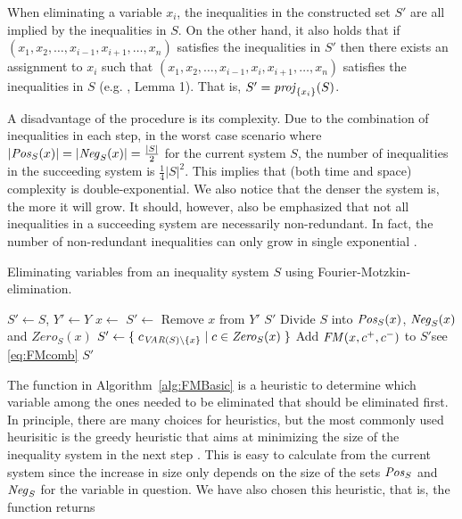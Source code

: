 When eliminating a variable $x_i$, the inequalities in the constructed set $S'$ are all implied by the inequalities in $S$. On the other hand, it also holds that if $(x_1, x_2, \ldots, x_{i-1}, x_{i+1}, \ldots, x_n)$ satisfies the inequalities in $S'$ then there exists an assignment to $x_i$ such that $(x_1, x_2, \ldots, x_{i-1}, x_i, x_{i+1}, \ldots, x_n)$ satisfies the inequalities in $S$ {(e.g. \cite{duffin74}, Lemma 1)}. That is, $S' = \mathit{proj}_{\{x_i\}}(S)$.

A disadvantage of the procedure is its complexity. Due to the combination of inequalities in each step, in the worst case scenario where $|\mathit{Pos}_S(x)| = |\mathit{Neg}_S(x)| = \frac{|S|}{2}$ for the current system $S$, the number of inequalities in the succeeding system is $\frac{1}{4}|S|^2$. This implies that (both time and space) complexity is double-exponential.  
We also notice that the denser the system is, the more it will grow. 
It should, however, also be emphasized that not all inequalities in a succeeding system are necessarily non-redundant. In fact, the
number of non-redundant inequalities can only grow in single exponential \cite{Monniaux10}.
%
\begin{algorithm}
\caption{Eliminating variables from an inequality system $S$ using Fourier-Motzkin-elimination.}\label{alg:FMBasic}
\begin{algorithmic}[1]
	\State  $S'\gets S$, $Y'\gets Y$
		\State $x\gets$ 
		\State $S' \gets$ 
		\State Remove $x$ from $Y'$
	\EndWhile
	\State \Return $S'$
\EndFunction
\Statex
{}
\State Divide $S$ into $\mathit{Pos}_S(x)$, $\mathit{Neg}_S(x)$ and $\mathit{Zero}_S(x)$
\State $S'\gets \{\;{c_{\mathit{VAR}(S)\setminus\{x\}}}\;|\;{c\in\mathit{Zero}_S(x)}\;\}$ 
		\State Add $\mathit{FM}(x,c^+, c^-)$ to $S'$\Comment see \eqref{eq:FMcomb}
	\EndFor
\EndFor
\State \Return $S'$
\EndFunction
\end{algorithmic}
\end{algorithm}
%
The function  in Algorithm~\ref{alg:FMBasic} is a heuristic to determine which variable among the ones needed to be eliminated that should be eliminated first. In principle, there are many choices for heuristics, but the most commonly used heurisitic is the greedy heuristic that aims at minimizing the size of the inequality system in the next step \cite{duffin74}. This is easy to calculate from the current system since the increase in size only depends on the size of the sets $\mathit{Pos}_S$ and $\mathit{Neg}_S$ for the variable in question. We have also chosen this heuristic, that is, the function  returns 
